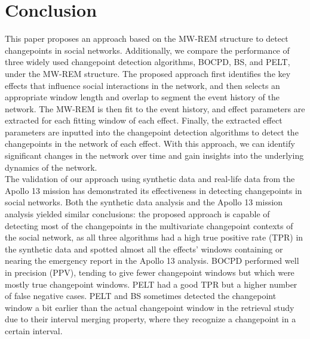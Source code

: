 \documentclass[]{interact}
\theoremstyle{plain}%
\theoremstyle{definition}
\theoremstyle{remark}
\begin{document}
{	\section{\fontsize{14}{15}\selectfont Conclusion} \label{sec:conclusion}
	
	\hspace{0.28cm} This paper proposes an approach based on the MW-REM structure to detect changepoints in social networks. Additionally, we compare the performance of three widely used changepoint detection algorithms, BOCPD, BS, and PELT, under the MW-REM structure. The proposed approach first identifies the key effects that influence social interactions in the network, and then selects an appropriate window length and overlap to segment the event history of the network. The MW-REM is then fit to the event history, and effect parameters are extracted for each fitting window of each effect. Finally, the extracted effect parameters are inputted into the changepoint detection algorithms to detect the changepoints in the network of each effect. With this approach, we can identify significant changes in the network over time and gain insights into the underlying dynamics of the network. \\
	
	The validation of our approach using synthetic data and real-life data from the Apollo 13 mission has demonstrated its effectiveness in detecting changepoints in social networks. Both the synthetic data analysis and the Apollo 13 mission analysis yielded similar conclusions: the proposed approach is capable of detecting most of the changepoints in the multivariate changepoint contexts of the social network, as all three algorithms had a high true positive rate (TPR) in the synthetic data and spotted almost all the effects' windows containing or nearing the emergency report in the Apollo 13 analysis. BOCPD performed well in precision (PPV), tending to give fewer changepoint windows but which were mostly true changepoint windows. PELT had a good TPR but a higher number of false negative cases. PELT and BS sometimes detected the changepoint window a bit earlier than the actual changepoint window in the retrieval study due to their interval merging property, where they recognize a changepoint in a certain interval. \\
	
}
\end{document}
